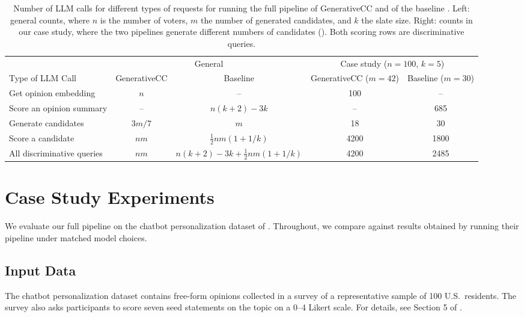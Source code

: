 \documentclass[letterpaper]{article} %
\begin{document}
\begin{table}[t]
\centering
{\small
\begin{tabular}{@{}l|cc|cc@{}}
\hline
& \multicolumn{2}{c|}{General} & \multicolumn{2}{c}{Case study (\(n=100\), \(k=5\))} \\
\cline{2-3}\cline{4-5}
Type of LLM Call & GenerativeCC & Baseline & GenerativeCC (\(m=42\)) & Baseline (\(m=30\)) \\
\hline
Get opinion embedding & $n$ & -- & 100 & -- \\
Score an opinion summary & -- & $n(k+2) - 3k$ & -- & 685 \\
Generate candidates & $3m/7$ & $m$ & 18 & 30 \\
Score a candidate & $nm$ & $\frac{1}{2} n m (1 + 1/k)$ & 4200 & 1800 \\
\hline
All discriminative queries & $nm$ & $n(k+2) - 3k + \frac{1}{2} n m (1 + 1/k)$ & 4200 & 2485 \\
\hline
\end{tabular}}
\caption{Number of LLM calls for different types of requests for running the full pipeline of GenerativeCC and of the baseline \citep{fish-v2}.
Left: general counts, where \(n\) is the number of voters, \(m\) the number of generated candidates, and \(k\) the slate size.
Right: counts in our case study, where the two pipelines generate different numbers of candidates ().
Both scoring rows are discriminative queries.}
\label{tab:llm-call-comparison}
\end{table}

\section{Case Study Experiments}

We evaluate our full pipeline on the chatbot personalization dataset of \citet{fish-v2}.
Throughout, we compare against results obtained by running their pipeline under matched model choices.

\subsection{Input Data}

The chatbot personalization dataset contains free-form opinions collected in a survey of a representative sample of 100 U.S.\ residents.
The survey also asks participants to score seven seed statements on the topic on a 0--4 Likert scale.
For details, see Section 5 of \citet{fish-v2}.
\end{document}
